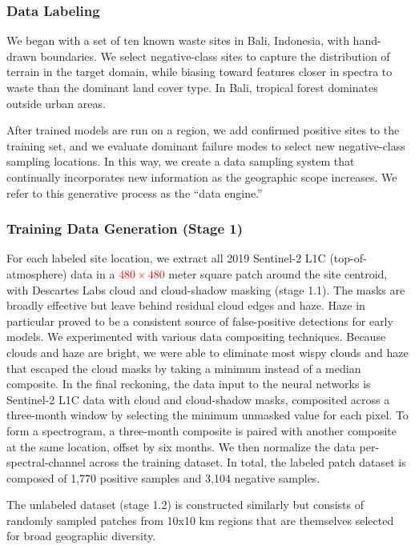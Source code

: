 \documentclass[10pt,letterpaper]{article}
\begin{document}
\subsubsection*{Data Labeling}
We began with a set of ten known waste sites in Bali, Indonesia, with hand-drawn boundaries. We select negative-class sites to capture the distribution of terrain in the target domain, while biasing toward features closer in spectra to waste than the dominant land cover type. In Bali, tropical forest dominates outside urban areas.

After trained models are run on a region, we add confirmed positive sites to the training set, and we evaluate dominant failure modes to select new negative-class sampling locations. In this way, we create a data sampling system that continually incorporates new information as the geographic scope increases. We refer to this generative process as the “data engine.”

\subsubsection*{Training Data Generation (Stage 1)}
For each labeled site location, we extract all 2019 Sentinel-2 L1C (top-of-atmosphere) data in a \textcolor{red}{$480\times480$} meter square patch around the site centroid, with Descartes Labs cloud and cloud-shadow masking (stage 1.1). The masks are broadly effective but leave behind residual cloud edges and haze. Haze in particular proved to be a consistent source of false-positive detections for early models. We experimented with various data compositing techniques. Because clouds and haze are bright, we were able to eliminate most wispy clouds and haze that escaped the cloud masks by taking a minimum instead of a median composite. In the final reckoning, the data input to the neural networks is Sentinel-2 L1C data with cloud and cloud-shadow masks, composited across a three-month window by selecting the minimum unmasked value for each pixel. To form a spectrogram, a three-month composite is paired with another composite at the same location, offset by six months. We then normalize the data per-spectral-channel across the training dataset. In total, the labeled patch dataset is composed of 1,770 positive samples and 3,104 negative samples.

The unlabeled dataset (stage 1.2) is constructed similarly but consists of randomly sampled patches from 10x10 km regions that are themselves selected for broad geographic diversity.
\end{document}
